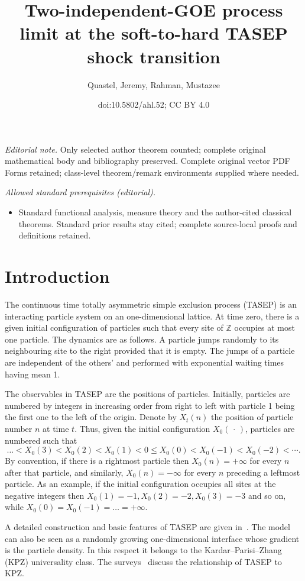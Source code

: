 \documentclass[10pt]{amsart}
\title{Two-independent-GOE process limit at the soft-to-hard TASEP shock transition}
\author{Quastel, Jeremy, Rahman, Mustazee}
\date{doi:10.5802/ahl.52; CC BY 4.0}
\theoremstyle{definition}\newtheorem{defi}[theo]{Definition}\newtheorem{rema}[theo]{Remark}\newtheorem{exam}[theo]{Example}\newtheorem{exem}[theo]{Example}\newtheorem{nota}[theo]{Notation}
\newcommand{\Z}{\mathbb{Z}}
\begin{document}
\maketitle
\noindent\textit{Editorial note.} Only selected author theorem counted; complete original mathematical body and bibliography preserved. Complete original vector PDF Forms retained; class-level theorem/remark environments supplied where needed.\par\medskip
\noindent\textit{Allowed standard prerequisites (editorial).}\begin{itemize}
\item Standard functional analysis, measure theory and the author-cited classical theorems. Standard prior results stay cited; complete source-local proofs and definitions retained.
\end{itemize}\medskip

\section{Introduction}

The continuous time totally asymmetric simple exclusion process (TASEP) is an interacting particle system on an one-dimensional lattice. At time zero, there is a given initial configuration of particles such that every site of $\Z$ occupies at most one particle. The dynamics are as follows. A particle jumps randomly to its neighbouring site to the right provided that it is empty. The jumps of a particle are independent of the others' and performed with exponential waiting times having mean 1.

The observables in TASEP are the positions of particles. Initially, particles are numbered by integers in increasing order from right to left with particle 1 being the first one to the left of the origin. Denote by $X_t(n)$ the position of particle number $n$ at time $t$. Thus, given the initial configuration $X_0({\,\cdot\,})$, particles are numbered such that
\[
\dots < X_0(3) < X_0(2) < X_0(1) < 0 \leq X_0(0) < X_0(-1) < X_0(-2) < \cdots.
\]
By convention, if there is a rightmost particle then $X_0(n) = + \infty$ for every $n$ after that particle, and similarly, $X_0(n) = - \infty$ for every $n$ preceding a leftmost particle. As an example, if the initial configuration occupies all sites at the negative integers then $X_0(1) = -1, X_0(2) = -2, X_0(3) = -3$ and so on, while $X_0(0) = X_0(-1)= \dots = + \infty$.

A detailed construction and basic features of TASEP are given in~\cite{Lig}. The model can also be seen as a randomly growing one-dimensional interface whose gradient is the particle density. In this respect it belongs to the Kardar--Parisi--Zhang (KPZ) universality class. The surveys~\cite{BG, Q} discuss the relationship of TASEP to KPZ.
\end{document}
